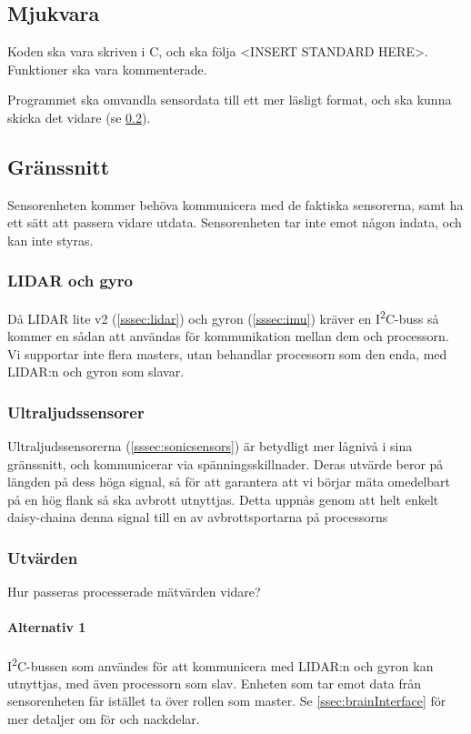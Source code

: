 \documentclass[a4paper,11pt]{article}
\begin{document}
\subsection{Mjukvara}

Koden ska vara skriven i C, och ska följa <INSERT STANDARD HERE>. Funktioner ska vara kommenterade.

Programmet ska omvandla sensordata till ett mer läsligt format, och ska kunna skicka det vidare (se \ref{ssec:sensorInterface}).

\subsection{Gränssnitt} \label{ssec:sensorInterface}
Sensorenheten kommer behöva kommunicera med de faktiska sensorerna, samt ha ett sätt att passera vidare utdata. Sensorenheten tar inte emot någon indata, och kan inte styras.

\subsubsection{LIDAR och gyro}
Då LIDAR lite v2 (\ref{sssec:lidar}) och gyron (\ref{sssec:imu}) kräver en I\textsuperscript{2}C-buss så kommer en sådan att användas för kommunikation mellan dem och processorn. Vi supportar inte flera masters, utan behandlar processorn som den enda, med LIDAR:n och gyron som slavar.

\subsubsection{Ultraljudssensorer}
Ultraljudssensorerna (\ref{sssec:sonicsensors}) är betydligt mer lågnivå i sina gränssnitt, och kommunicerar via spänningsskillnader. Deras utvärde beror på längden på dess höga signal, så för att garantera att vi börjar mäta omedelbart på en hög flank så ska avbrott utnyttjas. Detta uppnås genom att helt enkelt daisy-chaina denna signal till en av avbrottsportarna på processorns

\subsubsection{Utvärden}
Hur passeras processerade mätvärden vidare?

\paragraph{Alternativ 1}
I\textsuperscript{2}C-bussen som användes för att kommunicera med LIDAR:n och gyron kan utnyttjas, med även processorn som slav. Enheten som tar emot data från sensorenheten får istället ta över rollen som master. Se \ref{ssec:brainInterface} för mer detaljer om för och nackdelar.
\end{document}
